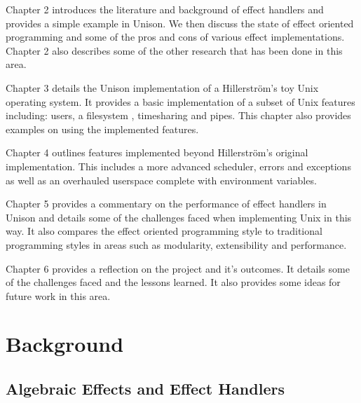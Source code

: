 \documentclass[logo,bsc,singlespacing,parskip]{infthesis}
\begin{document}
Chapter 2 introduces the literature and background of effect handlers and
provides a simple example in Unison. We then discuss the state of effect
oriented programming and some of the pros and cons of various effect
implementations. Chapter 2 also describes some of the other research that has
been done in this area.

Chapter 3 details the Unison implementation of a Hillerstr\"{o}m's toy Unix
operating system. It provides a basic implementation of a subset of Unix
features including: users, a filesystem , timesharing and pipes. This chapter
also provides examples on using the implemented features.

Chapter 4 outlines features implemented beyond Hillerstr\"{o}m's original
implementation. This includes a more advanced scheduler, errors and exceptions
as well as an overhauled userspace complete with environment variables.

Chapter 5 provides a commentary on the performance of effect handlers in Unison
and details some of the challenges faced when implementing Unix in this way.
It also compares the effect oriented programming style to traditional
programming styles in areas such as modularity, extensibility and performance.

Chapter 6 provides a reflection on the project and it's outcomes. It details
some of the challenges faced and the lessons learned. It also provides some
ideas for future work in this area.

\chapter{Background}

\section{Algebraic Effects and Effect Handlers}
\end{document}
